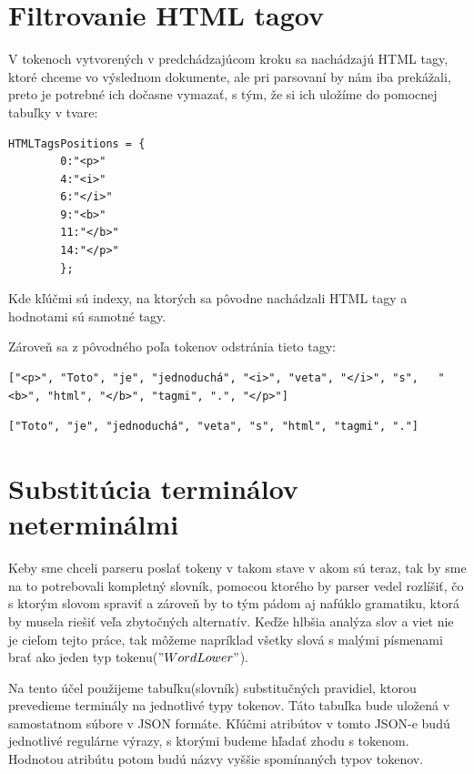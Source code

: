 \documentclass[12pt,a4paper]{report}
\theoremstyle{definition}
\theoremstyle{remark}
\begin{document}
\section{Filtrovanie HTML tagov}
V tokenoch vytvorených v predchádzajúcom kroku sa nachádzajú HTML tagy, ktoré chceme vo výslednom dokumente, ale pri parsovaní by nám iba prekážali, preto je potrebné ich dočasne vymazať, s tým, že si ich uložíme do pomocnej tabuľky v tvare:\\
\begin{lstlisting}[caption={Tabuľka HTML tagov}, style=htmlcssjs]
HTMLTagsPositions = {
		0:"<p>"
		4:"<i>"
		6:"</i>"
		9:"<b>"
		11:"</b>"
		14:"</p>"
		};
\end{lstlisting}

\noindent Kde kľúčmi sú indexy, na ktorých sa pôvodne nachádzali HTML tagy a hodnotami sú samotné tagy.

Zároveň sa z pôvodného poľa tokenov odstránia tieto tagy:
\begin{lstlisting}[caption={Text pred odstránením tagov}, style=htmlcssjs]
["<p>", "Toto", "je", "jednoduchá", "<i>", "veta", "</i>", "s",   "<b>", "html", "</b>", "tagmi", ".", "</p>"]
\end{lstlisting}
\begin{lstlisting}[caption={Text po odstránení tagov}, style=htmlcssjs]
["Toto", "je", "jednoduchá", "veta", "s", "html", "tagmi", "."]
\end{lstlisting}

\section{Substitúcia terminálov neterminálmi}
Keby sme chceli parseru poslať tokeny v takom stave v akom sú teraz, tak by sme na to potrebovali kompletný slovník, pomocou ktorého by parser vedel rozlíšiť, čo s ktorým slovom spraviť a zároveň by to tým pádom aj nafúklo gramatiku, ktorá by musela riešiť veľa zbytočných alternatív. Keďže hlbšia analýza slov a viet nie je cieľom tejto práce, tak  môžeme napríklad všetky slová s malými písmenami brať ako jeden typ tokenu($"WordLower"$).

Na tento účel použijeme tabuľku(slovník) substitučných pravidiel, ktorou prevedieme terminály na jednotlivé typy tokenov. Táto tabuľka bude uložená v samostatnom súbore v JSON formáte. Kľúčmi atribútov v tomto JSON-e budú jednotlivé regulárne výrazy, s ktorými budeme hľadať zhodu s tokenom. Hodnotou atribútu potom budú názvy vyššie spomínaných typov tokenov.
\end{document}
